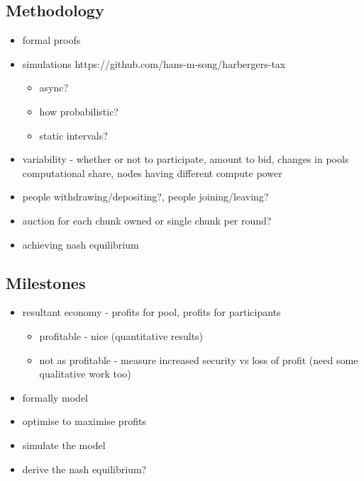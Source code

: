 \subsection{Methodology}

\begin{itemize}
  \item formal proofs
  \item simulations https://github.com/hans-m-song/harbergers-tax 
  \begin{itemize}
    \item async? 
    \item how probabilistic?
    \item static intervals?
  \end{itemize}
  \item variability - whether or not to participate, amount to bid, changes in pools computational share, nodes having different compute power
  \item people withdrawing/depositing?, people joining/leaving?
  \item auction for each chunk owned or single chunk per round?
  \item achieving nash equilibrium
\end{itemize}

\subsection{Milestones}

\begin{itemize}
  \item resultant economy - profits for pool, profits for participants
  \begin{itemize}
    \item profitable - nice (quantitative results)
    \item not as profitable - measure increased security vs loss of profit (need some qualitative work too)
  \end{itemize}
\end{itemize}

\begin{itemize}
 
  \item formally model
  \item optimise to maximise profits
  \item simulate the model
  \item derive the nash equilibrium?
\end{itemize} 

